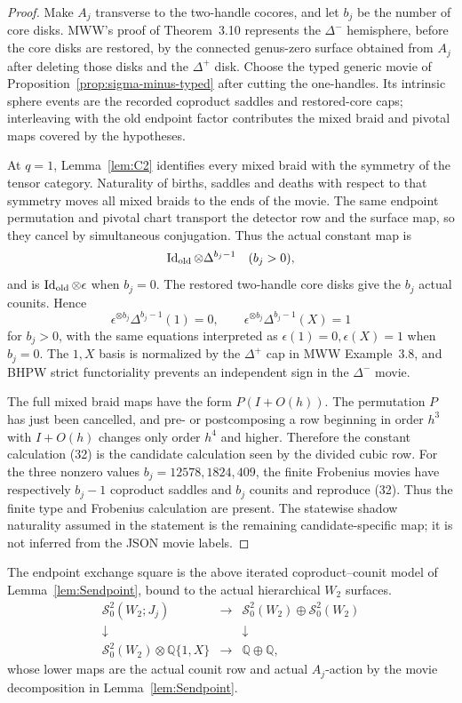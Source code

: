 \documentclass[11pt]{amsart}
\theoremstyle{definition}
\theoremstyle{remark}
\newcommand{\Q}{\mathbb{Q}}
\begin{document}
\begin{proof}
Make \(A_j\) transverse to the two-handle cocores, and let \(b_j\) be the
number of core disks.  MWW's proof of Theorem~3.10 represents the
\(\Delta^-\) hemisphere, before the core disks are restored, by the connected
genus-zero surface obtained from \(A_j\) after deleting those disks and the
\(\Delta^+\) disk.  Choose the typed generic movie of
Proposition~\ref{prop:sigma-minus-typed} after cutting the one-handles.  Its
intrinsic sphere events are the recorded coproduct saddles and restored-core
caps; interleaving with the old endpoint factor contributes the mixed braid
and pivotal maps covered by the hypotheses.

At \(q=1\), Lemma~\ref{lem:C2} identifies every mixed braid with the
symmetry of the tensor category.  Naturality of births, saddles and deaths
with respect to that symmetry moves all mixed braids to the ends of the
movie.  The same endpoint permutation and pivotal chart transport the
detector row and the surface map, so they cancel by simultaneous
conjugation.  Thus the actual constant map is
\[
\operatorname{Id}_{\rm old}\otimes\Delta^{b_j-1}\quad(b_j>0),
\]
and is \(\operatorname{Id}_{\rm old}\otimes\epsilon\) when \(b_j=0\).
The restored two-handle core disks give the \(b_j\) actual counits.  Hence
\[
\epsilon^{\otimes b_j}\Delta^{b_j-1}(1)=0,\qquad
\epsilon^{\otimes b_j}\Delta^{b_j-1}(X)=1
\tag{32}
\]
for \(b_j>0\), with the same equations interpreted as
\(\epsilon(1)=0,\epsilon(X)=1\) when \(b_j=0\).
The \(1,X\) basis is normalized by the \(\Delta^+\) cap in MWW
Example~3.8, and BHPW strict functoriality prevents an independent sign in
the \(\Delta^-\) movie.

The full mixed braid maps have the form \(P(I+O(h))\).  The permutation
\(P\) has just been cancelled, and pre- or postcomposing a row beginning in
order \(h^3\) with \(I+O(h)\) changes only order \(h^4\) and higher.
Therefore the constant calculation (32) is the candidate calculation seen by
the divided cubic row.  For the three nonzero values
$b_j=12578,1824,409$, the finite Frobenius movies have respectively
$b_j-1$ coproduct saddles and $b_j$ counits and reproduce (32).  Thus the
finite type and Frobenius calculation are present.  The statewise shadow
naturality assumed in the statement is the remaining candidate-specific map;
it is not inferred from the JSON movie labels.
\end{proof}

The endpoint exchange square is the above iterated coproduct--counit model of
Lemma~\ref{lem:Sendpoint}, bound to the actual hierarchical $W_2$ surfaces.
\[
\begin{array}{ccc}
\mathcal S^2_0(W_2;J_j)&\longrightarrow&
\mathcal S^2_0(W_2)\oplus\mathcal S^2_0(W_2)\\
\downarrow&&\downarrow\\
\mathcal S^2_0(W_2)\otimes\Q\{1,X\}&\longrightarrow&\Q\oplus\Q,
\end{array}
\]
whose lower maps are the actual counit row and actual \(A_j\)-action by the
movie decomposition in Lemma~\ref{lem:Sendpoint}.
\end{document}

